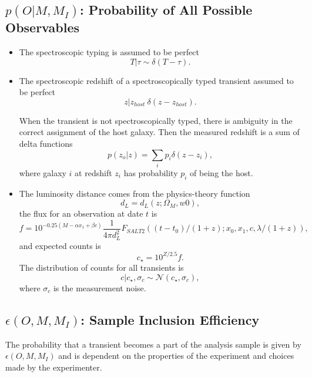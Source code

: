 \documentclass[preprint,3p]{elsarticle}
\begin{document}
\subsection{$p(O| M, M_I)$: Probability of All Possible Observables}
\begin{itemize}
\item The spectroscopic typing is assumed to be perfect
\begin{equation}
T | \tau \sim \delta (T-\tau).
\end{equation}

\item The spectroscopic redshift of a spectroscopically typed transient assumed to be perfect
\begin{equation}
z | z_{host} ~ \delta (z-z_{host}).
\end{equation}

When the transient is not spectroscopically typed, there is ambiguity in the correct assignment of the host galaxy.
Then the measured redshift is a sum of delta functions
\begin{equation}
p(z_o|z) = \sum_i p_i \delta(z-z_i),
\end{equation}
where galaxy $i$ at
redshift $z_i$ has probability $p_i$ of being
the host.  

\item  The luminosity distance comes from the physics-theory function
\begin{equation}
d_L = d_L(z; \Omega_M, w0),
\end{equation}
the flux for an observation at date $t$ is
\begin{equation}
f = 10^{-0.25 \left(M - \alpha x_1 + \beta c \right)}\frac{1}{4\pi d_L^2} F_{SALT2}((t-t_0)/(1+z); x_0,  x_1, c, \lambda/(1+z)),
\end{equation}
and expected counts is
\begin{equation}
c_\star = 10^{Z/2.5}f.
\end{equation}
The distribution of counts for all transients is 
\begin{equation}
c | c_\star, \sigma_c \sim \mathcal{N}(c_\star, \sigma_c),
\end{equation}
where $\sigma_c$ is the measurement noise.

\end{itemize}

\subsection{$\epsilon(O, M, M_I)$: Sample Inclusion Efficiency}
The probability that a transient becomes a part of the analysis sample is given by $\epsilon(O, M, M_I)$ and is dependent
on the properties of the experiment and choices made by the experimenter.
\end{document}
